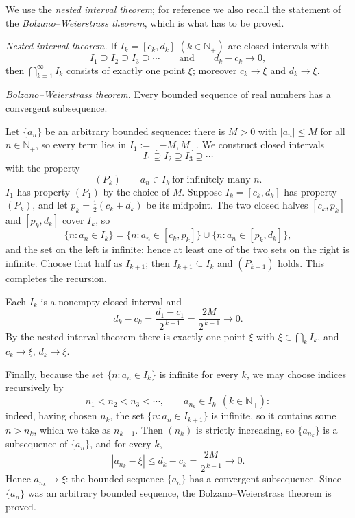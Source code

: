 \documentclass[11pt,a4paper]{article}
\newenvironment{solution}[1]{%
  \par\addvspace{1.7ex}%
  \noindent{\color{solutioncolor}\textbf{#1}}\hspace{0.55em}\ignorespaces}%
  {\par\addvspace{0.9ex}}
\begin{document}
\begin{solution}{Solution 2.3.18}\label{xs:2.3.18}
We use the \emph{nested interval theorem}; for reference we also recall the statement of the \emph{Bolzano--Weierstrass theorem}, which is what has to be proved.

\emph{Nested interval theorem.} If $I_k = [c_k, d_k]$ $(k \in \mathbb{N}_+)$ are closed intervals with
\[
I_1 \supseteq I_2 \supseteq I_3 \supseteq \cdots
\qquad\text{and}\qquad d_k - c_k \longrightarrow 0,
\]
then $\bigcap_{k=1}^{\infty} I_k$ consists of exactly one point $\xi$; moreover $c_k \to \xi$ and $d_k \to \xi$.

\emph{Bolzano--Weierstrass theorem.} Every bounded sequence of real numbers has a convergent subsequence.

\medskip
Let $\{a_n\}$ be an arbitrary bounded sequence: there is $M > 0$ with $|a_n| \le M$ for all $n \in \mathbb{N}_+$, so every term lies in $I_1 := [-M, M]$. We construct closed intervals
\[
I_1 \supseteq I_2 \supseteq I_3 \supseteq \cdots
\]
with the property
\[
(P_k) \qquad a_n \in I_k \ \text{for infinitely many } n .
\]
$I_1$ has property $(P_1)$ by the choice of $M$. Suppose $I_k = [c_k, d_k]$ has property $(P_k)$, and let $p_k = \tfrac{1}{2}(c_k + d_k)$ be its midpoint. The two closed halves $[c_k, p_k]$ and $[p_k, d_k]$ cover $I_k$, so
\[
\{n : a_n \in I_k\} = \{n : a_n \in [c_k,p_k]\} \cup \{n : a_n \in [p_k,d_k]\},
\]
and the set on the left is infinite; hence at least one of the two sets on the right is infinite. Choose that half as $I_{k+1}$; then $I_{k+1} \subseteq I_k$ and $(P_{k+1})$ holds. This completes the recursion.

Each $I_k$ is a nonempty closed interval and
\[
d_k - c_k = \frac{d_1 - c_1}{2^{\,k-1}} = \frac{2M}{2^{\,k-1}} \longrightarrow 0 .
\]
By the nested interval theorem there is exactly one point $\xi$ with $\xi \in \bigcap_k I_k$, and $c_k \to \xi$, $d_k \to \xi$.

Finally, because the set $\{n : a_n \in I_k\}$ is infinite for every $k$, we may choose indices recursively by
\[
n_1 < n_2 < n_3 < \cdots, \qquad a_{n_k} \in I_k \ \ (k \in \mathbb{N}_+):
\]
indeed, having chosen $n_k$, the set $\{n : a_n \in I_{k+1}\}$ is infinite, so it contains some $n > n_k$, which we take as $n_{k+1}$. Then $(n_k)$ is strictly increasing, so $\{a_{n_k}\}$ is a subsequence of $\{a_n\}$, and for every $k$,
\[
|a_{n_k} - \xi| \le d_k - c_k = \frac{2M}{2^{\,k-1}} \longrightarrow 0 .
\]
Hence $a_{n_k} \to \xi$: the bounded sequence $\{a_n\}$ has a convergent subsequence. Since $\{a_n\}$ was an arbitrary bounded sequence, the Bolzano--Weierstrass theorem is proved.
\end{solution}
\end{document}
